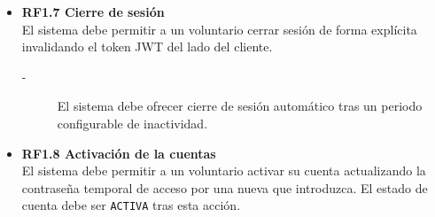 \begin{itemize}
    \item \textbf{RF1.7 Cierre de sesión} \\
    El sistema debe permitir a un voluntario cerrar sesión de forma explícita invalidando el token JWT 
    del lado del cliente.
    \begin{description}
        \item[-] El sistema debe ofrecer cierre de sesión automático tras un periodo
        configurable de inactividad.
    \end{description}

    \item \textbf{RF1.8 Activación de la cuentas} \\
    El sistema debe permitir a un voluntario activar su cuenta actualizando la contraseña temporal de acceso por una nueva que introduzca. 
    El estado de cuenta debe ser \texttt{ACTIVA} tras esta acción.
\end{itemize}




